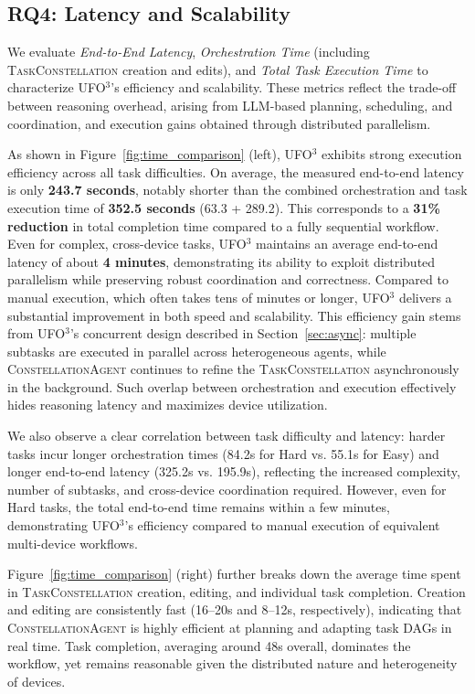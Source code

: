 \documentclass[10pt]{article} %
\newcommand{\ufo}{\textsc{UFO}$^3$\xspace}
\newcommand{\cagent}{\textsc{ConstellationAgent}\xspace}
\newcommand{\TaskConstellation}{\textsc{TaskConstellation}\xspace}
\begin{document}
\subsection{RQ4: Latency and Scalability}
We evaluate \textit{End-to-End Latency}, \textit{Orchestration Time} (including \TaskConstellation creation and edits), and \textit{Total Task Execution Time} to characterize \ufo's efficiency and scalability. These metrics reflect the trade-off between reasoning overhead, arising from LLM-based planning, scheduling, and coordination, and execution gains obtained through distributed parallelism.


As shown in Figure~\ref{fig:time_comparison} (left), \ufo exhibits strong execution efficiency across all task difficulties. On average, the measured end-to-end latency is only \textbf{243.7 seconds}, notably shorter than the combined orchestration and task execution time of \textbf{352.5 seconds} (63.3 + 289.2). This corresponds to a \textbf{31\% reduction} in total completion time compared to a fully sequential workflow. Even for complex, cross-device tasks, \ufo maintains an average end-to-end latency of about \textbf{4 minutes}, demonstrating its ability to exploit distributed parallelism while preserving robust coordination and correctness. Compared to manual execution, which often takes tens of minutes or longer, \ufo delivers a substantial improvement in both speed and scalability. This efficiency gain stems from \ufo's concurrent design described in Section~\ref{sec:async}: multiple subtasks are executed in parallel across heterogeneous agents, while \cagent continues to refine the \TaskConstellation asynchronously in the background. Such overlap between orchestration and execution effectively hides reasoning latency and maximizes device utilization.


We also observe a clear correlation between task difficulty and latency: harder tasks incur longer orchestration times (84.2s for Hard vs. 55.1s for Easy) and longer end-to-end latency (325.2s vs. 195.9s), reflecting the increased complexity, number of subtasks, and cross-device coordination required. However, even for Hard tasks, the total end-to-end time remains within a few minutes, demonstrating \ufo's efficiency compared to manual execution of equivalent multi-device workflows.

Figure~\ref{fig:time_comparison} (right) further breaks down the average time spent in \TaskConstellation creation, editing, and individual task completion. Creation and editing are consistently fast (16–20s and 8–12s, respectively), indicating that \cagent is highly efficient at planning and adapting task DAGs in real time. Task completion, averaging around 48s overall, dominates the workflow, yet remains reasonable given the distributed nature and heterogeneity of devices. 
\end{document}
